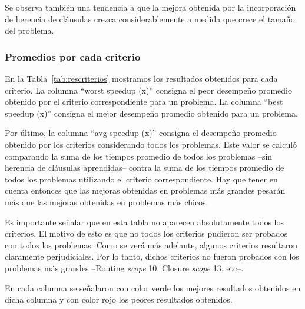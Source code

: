 Se observa también una tendencia a que la mejora obtenida por la incorporación
de herencia de cláusulas crezca considerablemente a medida que crece el tamaño
del problema.

\subsubsection{Promedios por cada criterio}

En la Tabla~\ref{tab:rescriterios} mostramos los resultados obtenidos para
cada criterio. La columna ``worst speedup (x)'' consigna el peor desempeño
promedio obtenido por el criterio correspondiente para un problema. La columna
``best speedup (x)'' consigna el mejor desempeño promedio obtenido para un
problema.

Por último, la columna ``avg speedup (x)'' consigna el desempeño promedio
obtenido por los criterios considerando todos los problemas. Este valor se
calculó comparando la suma de los tiempos promedio de todos los problemas
--sin herencia de cláusulas aprendidas-- contra la suma de los tiempos
promedio de todos los problemas utilizando el criterio correspondiente. Hay
que tener en cuenta entonces que las mejoras obtenidas en problemas más
grandes pesarán más que las mejoras obtenidas en problemas más chicos.

Es importante señalar que en esta tabla no aparecen absolutamente todos los
criterios. El motivo de esto es que no todos los criterios pudieron ser
probados con todos los problemas. Como se verá más adelante, algunos criterios
resultaron claramente perjudiciales. Por lo tanto, dichos criterios no fueron
probados con los problemas más grandes --Routing \emph{scope} 10, Closure
\emph{scope} 13, etc--.

En cada columna se señalaron con color verde los mejores resultados obtenidos
en dicha columna y con color rojo los peores resultados obtenidos.


